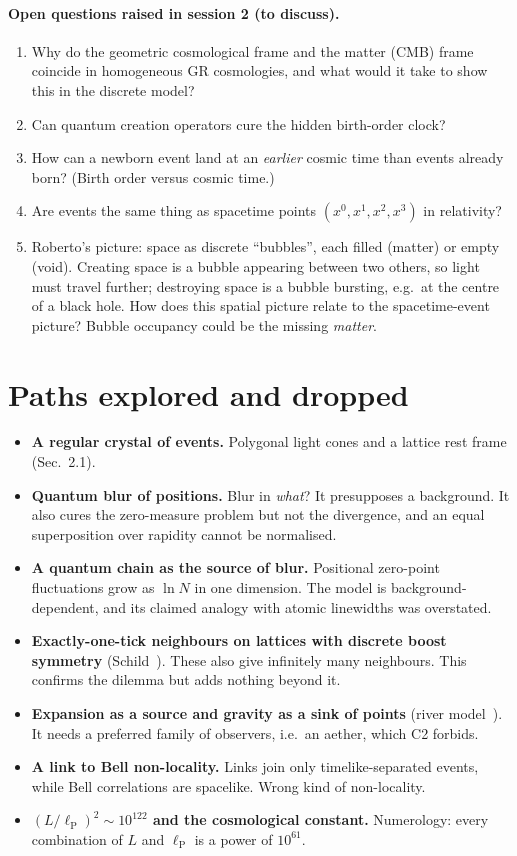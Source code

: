 \documentclass[11pt,a4paper]{article}
\newcommand{\lP}{\ell_{\mathrm P}}
\begin{document}
\paragraph{Open questions raised in session 2 (to discuss).}
\begin{enumerate}[leftmargin=*,itemsep=1pt]
\item Why do the geometric cosmological frame and the matter (CMB) frame coincide in homogeneous GR cosmologies, and what would it take to show this in the discrete model?
\item Can quantum creation operators cure the hidden birth-order clock?
\item How can a newborn event land at an \emph{earlier} cosmic time than events already born? (Birth order versus cosmic time.)
\item Are events the same thing as spacetime points $(x^0,x^1,x^2,x^3)$ in relativity?
\item Roberto's picture: space as discrete ``bubbles'', each filled (matter) or empty (void). Creating space is a bubble appearing between two others, so light must travel further; destroying space is a bubble bursting, e.g.\ at the centre of a black hole. How does this spatial picture relate to the spacetime-event picture? Bubble occupancy could be the missing \emph{matter}.
\end{enumerate}

\appendix
\section{Paths explored and dropped}\label{app:dropped}
\begin{itemize}[leftmargin=*,itemsep=1pt]
\item \textbf{A regular crystal of events.} Polygonal light cones and a lattice rest frame (Sec.~2.1).
\item \textbf{Quantum blur of positions.} Blur in \emph{what}? It presupposes a background. It also cures the zero-measure problem but not the divergence, and an equal superposition over rapidity cannot be normalised.
\item \textbf{A quantum chain as the source of blur.} Positional zero-point fluctuations grow as $\ln N$ in one dimension. The model is background-dependent, and its claimed analogy with atomic linewidths was overstated.
\item \textbf{Exactly-one-tick neighbours on lattices with discrete boost symmetry} (Schild~\cite{Schild48}). These also give infinitely many neighbours. This confirms the dilemma but adds nothing beyond it.
\item \textbf{Expansion as a source and gravity as a sink of points} (river model~\cite{HamiltonLisle08}). It needs a preferred family of observers, i.e.\ an aether, which C2 forbids.
\item \textbf{A link to Bell non-locality.} Links join only timelike-separated events, while Bell correlations are spacelike. Wrong kind of non-locality.
\item \textbf{$(L/\lP)^2\sim10^{122}$ and the cosmological constant.} Numerology: every combination of $L$ and $\lP$ is a power of $10^{61}$.
\end{itemize}
\end{document}
